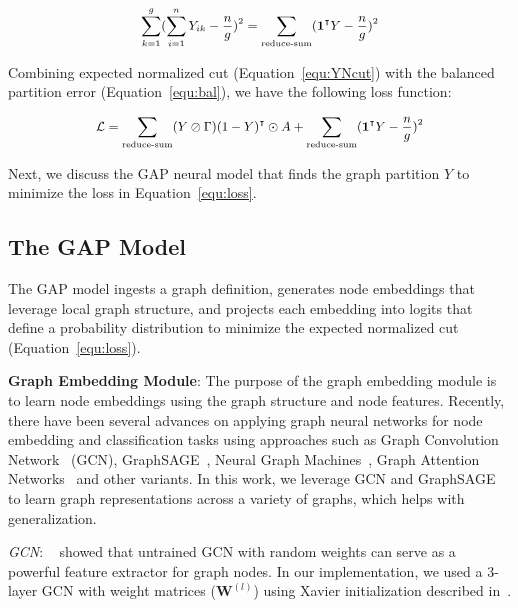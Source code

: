 \documentclass[10pt,twocolumn]{article}
\begin{document}
\begin{equation}
\label{equ:bal}
\small
\begin{aligned}
\sum_{k=1}^{g} (\sum_{i=1}^{n} Y_{ik} - \frac{n}{g})^2 = \sum_\text{reduce-sum} (\mathbf{1}^\intercal Y - \frac{n}{g})^2
\end{aligned}
\end{equation}

Combining expected normalized cut (Equation~\ref{equ:YNcut}) with the balanced partition error (Equation~\ref{equ:bal}), we have the following loss function:

\begin{equation}
\label{equ:loss}
\small
\begin{aligned}
\mathcal{L} = \sum_\text{reduce-sum} (Y \oslash \Gamma) (1-Y)^\intercal \odot A + \sum_\text{reduce-sum} (\mathbf{1}^\intercal Y - \frac{n}{g})^2
\end{aligned}
\end{equation}

Next, we discuss the GAP neural model that finds the graph partition $Y$ to minimize the loss in Equation~\ref{equ:loss}.

\subsection{The GAP Model}
\label{sec:framework}

The GAP model ingests a graph definition, generates node embeddings that leverage local graph structure, and projects each embedding into logits that define a probability distribution to minimize the expected normalized cut (Equation~\ref{equ:loss}). 

\noindent\textbf{Graph Embedding Module}:
The purpose of the graph embedding module is to learn node embeddings using the graph structure and node features. Recently, there have been several advances on applying graph neural networks for node embedding and classification tasks using approaches such as Graph Convolution Network~\cite{kipf2017semi} (GCN), GraphSAGE~\cite{HamiltonYL17}, Neural Graph Machines~\cite{NGL17}, Graph Attention Networks~\cite{GAT2018} and other variants. In this work, we leverage GCN and GraphSAGE to learn graph representations across a variety of graphs, which helps with generalization. 

\noindent\emph{GCN}:
~\cite{kipf2017semi} showed that untrained GCN with random weights can serve as a powerful feature extractor for graph nodes. In our implementation, we used a 3-layer GCN with weight matrices ($\mathbf{W}^{(l)}$) using Xavier initialization described in~\cite{Xavier_2010}.
\end{document}
